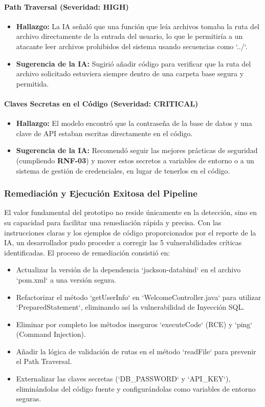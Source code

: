 \paragraph{Path Traversal (Severidad: HIGH)}
\begin{itemize}
    \item \textbf{Hallazgo:} La IA señaló que una función que leía archivos tomaba la ruta del archivo directamente de la entrada del usuario, lo que le permitiría a un atacante leer archivos prohibidos del sistema usando secuencias como `../`.
    \item \textbf{Sugerencia de la IA:} Sugirió añadir código para verificar que la ruta del archivo solicitado estuviera siempre dentro de una carpeta base segura y permitida.
\end{itemize}

\paragraph{Claves Secretas en el Código (Severidad: CRITICAL)}
\begin{itemize}
    \item \textbf{Hallazgo:} El modelo encontró que la contraseña de la base de datos y una clave de API estaban escritas directamente en el código.
    \item \textbf{Sugerencia de la IA:} Recomendó seguir las mejores prácticas de seguridad (cumpliendo \textbf{RNF-03}) y mover estos secretos a variables de entorno o a un sistema de gestión de credenciales, en lugar de tenerlos en el código.
\end{itemize}
\subsubsection{Remediación y Ejecución Exitosa del Pipeline}
\label{subsec:remediacion_exitosa}

El valor fundamental del prototipo no reside únicamente en la detección, sino en su capacidad para facilitar una remediación rápida y precisa. Con las instrucciones claras y los ejemplos de código proporcionados por el reporte de la IA, un desarrollador pudo proceder a corregir las 5 vulnerabilidades críticas identificadas. El proceso de remediación consistió en:
\begin{itemize}
    \item Actualizar la versión de la dependencia `jackson-databind` en el archivo `pom.xml` a una versión segura.
    \item Refactorizar el método `getUserInfo` en `WelcomeController.java` para utilizar `PreparedStatement`, eliminando así la vulnerabilidad de Inyección SQL.
    \item Eliminar por completo los métodos inseguros `executeCode` (RCE) y `ping` (Command Injection).
    \item Añadir la lógica de validación de rutas en el método `readFile` para prevenir el Path Traversal.
    \item Externalizar las claves secretas (`DB\_PASSWORD` y `API\_KEY`), eliminándolas del código fuente y configurándolas como variables de entorno seguras.
\end{itemize}

